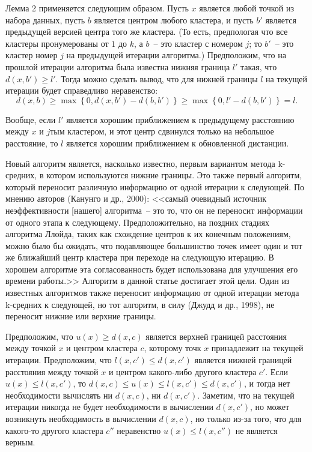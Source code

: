 Лемма 2 применяется следующим образом. Пусть \( x \) является любой точкой из набора данных, пусть \( b \) является центром любого кластера, и пусть \( b' \) является предыдущей версией центра того же кластера. (То есть, предпологая что все кластеры пронумерованы от \( 1 \) до \( k \), а \( b \)~-- это кластер с номером \( j \); то \( b' \)~-- это кластер номер \( j \) на предыдущей итерации алгоритма.) Предположим, что на прошлой итерации алгоритма была известна нижняя граница \( l' \) такая, что \( d(x, b') \ge l' \). Тогда можно сделать вывод, что для нижней границы \( l \) на текущей итерации будет справедливо неравенство:
\[
  d(x, b) \ge \max\left\{0, d(x, b') - d(b, b')\right\} \ge \max\left\{0, l' - d(b, b')\right\} = l.
\]

Вообще, если \( l' \) является хорошим приближением к предыдущему расстоянию между \( x \) и \( j \)тым кластером, и этот центр сдвинулся только на небольшое расстояние, то \( l \) является хорошим приближением к обновленной дистанции.

Новый алгоритм является, насколько известно, первым вариантом метода k-средних, в котором используются нижние границы. Это также первый алгоритм, который переносит различную информацию от одной итерации к следующей. По мнению авторов (Канунго и др., 2000): <<самый очевидный источник неэффективности [нашего] алгоритма~-- это то, что он не переносит информации от одного этапа к следующему. Предположительно, на поздних стадиях алгоритма Ллойда, таких как схождение центров к их конечным положениям, можно было бы ожидать, что подавляющее большинство точек имеет один и тот же ближайший центр кластера при переходе на следующую итерацию. В хорошем алгоритме эта согласованность будет использована для улучшения его времени работы.>> Алгоритм в данной статье достигает этой цели. Один из известных алгоритмов также переносит информацию от одной итерации метода k-средних к следующей, но тот алгоритм, в силу (Джудд и др., 1998), не переносит нижние или верхние границы.

Предположим, что \( u(x) \ge d(x, c) \) является верхней границей расстояния между точкой \( x \) и центром кластера \( c \), которому точк \( x \) принадлежит на текущей итерации. Предположим, что \( l(x, c') \le d(x, c') \) является нижней границей расстояния между точкой \( x \) и центром какого-либо другого кластера \( c' \). Если \( u(x) \le l(x, c') \), то \( d(x, c) \le u(x) \le l(x, c') \le d(x, c') \), и тогда нет необходимости вычислять ни \( d(x, c) \), ни \( d(x, c') \). Заметим, что на текущей итерации никогда не будет необходимости в вычислении \( d(x, c') \), но может возникнуть необходимость в вычислении \( d(x, c) \), но только из-за того, что для какого-то другого кластера \( c'' \) неравенство \( u(x) \le l(x, c'') \) не является верным.

